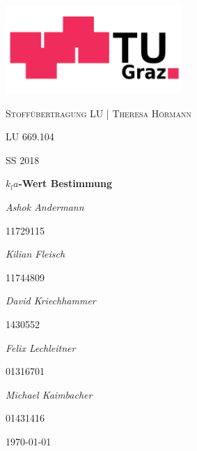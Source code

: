 \documentclass[12pt,liststotoc]{report}
\begin{document}
\setcounter{secnumdepth}{5}
\setcounter{tocdepth}{5}

\begin{titlepage}
	\centering
	\includegraphics[width=0.5\textwidth]{Graphics/TU_Graz.pdf}\par\vspace{1cm}
	
	{\scshape\LARGE Stoffübertragung LU | Theresa Hörmann  \par}
	\vspace{1cm}
	{\scshape\Large LU 669.104\par}
	{\scshape \large SS 2018\par}
	\vspace{0.5cm}
	{\huge\bfseries $k_la$-Wert Bestimmung \par}
	\vspace{0.5cm}

	{\LARGE \itshape Ashok Andermann\par}
	{\large 11729115\par}\vspace{0.5cm}
	
	{\LARGE \itshape Kilian Fleisch\par}
	{\large 11744809\par}\vspace{0.5cm}
	
		
	{\LARGE \itshape David Kriechhammer\par}
	{\large 1430552\par}\vspace{0.5cm}
	
	{\LARGE \itshape Felix Lechleitner\par}
	{\large 01316701\par}\vspace{0.5cm}

	{\LARGE \itshape Michael Kaimbacher\par}
	{\large 01431416\par}\vspace{0.5cm}
	\vfill

	{\large \today\par}
\end{titlepage}
\end{document}
